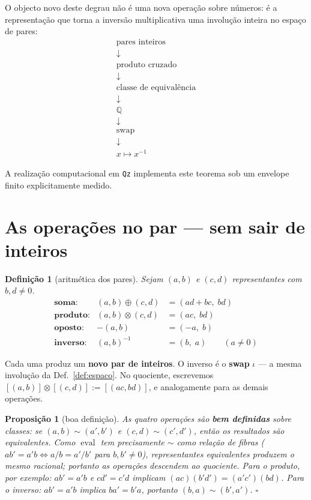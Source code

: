 \documentclass[11pt,a4paper]{article}
\newtheorem{proposicao}[teorema]{Proposição}
\newtheorem{definicao}{Definição}
\newcommand{\code}[1]{\texttt{\small #1}}
\begin{document}
\noindent O objecto novo deste degrau não é uma nova operação sobre números: é
a representação que torna a inversão multiplicativa uma involução inteira no
espaço de pares:
\[
\boxed{
\begin{array}{c}
\text{pares inteiros}\\
\downarrow\\
\text{produto cruzado}\\
\downarrow\\
\text{classe de equivalência}\\
\downarrow\\
\mathbb{Q}\\
\downarrow\\
\text{swap}\\
\downarrow\\
x\mapsto x^{-1}
\end{array}}
\]

\noindent A realização computacional em \code{Qz} implementa este teorema sob
um envelope finito explicitamente medido.

\section{As operações no par --- sem sair de inteiros}\label{sec:ops}

\begin{definicao}[aritmética dos pares]\label{def:ops}
Sejam $(a,b)$ e $(c,d)$ representantes com $b,d\neq 0$.
\[
\boxed{\;
\begin{array}{rll}
\textbf{soma:}     & (a,b)\oplus(c,d) &= (ad+bc,\; bd)\\[4pt]
\textbf{produto:}  & (a,b)\otimes(c,d) &= (ac,\; bd)\\[4pt]
\textbf{oposto:}   & -(a,b) &= (-a,\; b)\\[4pt]
\textbf{inverso:}  & (a,b)^{-1} &= (b,\; a) \qquad(a\neq 0)
\end{array}\;}
\]
\end{definicao}

\noindent Cada uma produz um \textbf{novo par de inteiros}. O inverso é o
\textbf{swap} $\iota$ --- a mesma involução da Def.~\ref{def:espaco}.
No quociente, escrevemos
$[(a,b)]\otimes[(c,d)]:=[(ac,bd)]$, e analogamente para as demais operações.

\begin{proposicao}[boa definição]\label{prop:bemdef}
As quatro operações são \textbf{bem definidas} sobre classes: se
$(a,b)\sim(a',b')$ e $(c,d)\sim(c',d')$, então os resultados são equivalentes.
Como $\operatorname{eval}$ tem precisamente $\sim$ como relação de fibras
($ab'=a'b \Leftrightarrow a/b=a'/b'$ para $b,b'\neq 0$), representantes
equivalentes produzem o mesmo racional; portanto as operações descendem ao
quociente. Para o produto, por exemplo: $ab'=a'b$ e $cd'=c'd$ implicam
$(ac)(b'd')=(a'c')(bd)$. Para o inverso: $ab'=a'b$ implica $ba'=b'a$,
portanto $(b,a)\sim(b',a')$. $\square$
\end{proposicao}
\end{document}
